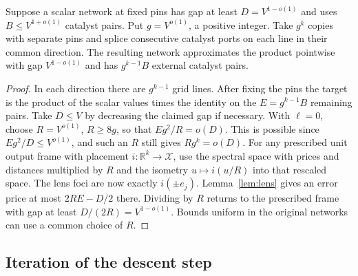\begin{lemma}\label{lem:reuse}
Suppose a scalar network at fixed pins has gap at least $D=V^{1-o(1)}$ and
uses $B\le V^{1+o(1)}$ catalyst pairs. Put $g=V^{o(1)}$, a positive
integer. Take $g^k$ copies with separate pins and splice consecutive
catalyst ports on each line in their common direction. The resulting
network approximates the product pointwise with gap $V^{1-o(1)}$ and has
$g^{k-1}B$ external catalyst pairs.
\end{lemma}
\begin{proof}
In each direction there are $g^{k-1}$ grid lines. After fixing the pins
the target is the product of the scalar values times the identity on the
$E=g^{k-1}B$ remaining pairs. Take $D\le V$ by decreasing the claimed
gap if necessary. With $\ell=0$, choose $R=V^{o(1)}$, $R\ge8g$, so that
$Eg^2/R=o(D)$. This is possible since $Eg^2/D\le V^{o(1)}$, and such
an $R$ still gives $Rg^k=o(D)$. For any prescribed unit output frame with
placement $i:\mathbb R^k\to\mathcal X$, use the spectral space with prices
and distances multiplied by $R$ and the isometry $u\mapsto i(u/R)$ into
that rescaled space. The lens foci are now exactly $i(\pm e_j)$.
Lemma~\ref{lem:lens} gives an error price at most $2RE-D/2$ there.
Dividing by $R$ returns to the prescribed frame with gap at least
$D/(2R)=V^{1-o(1)}$. Bounds uniform in the original networks can use a
common choice of $R$.
\end{proof}

\subsection{Iteration of the descent step}

